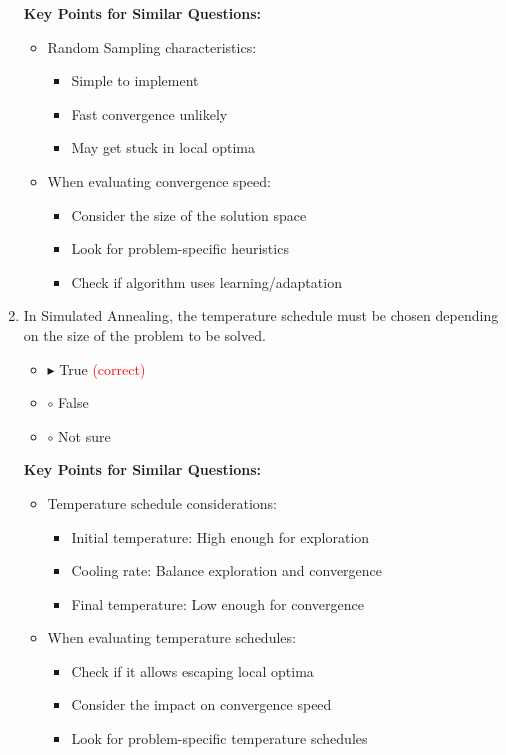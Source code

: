 \begin{enumerate}[label=\alph*)]
\textbf{Key Points for Similar Questions:}
\begin{itemize}
\item Random Sampling characteristics:
  \begin{itemize}
  \item Simple to implement
  \item Fast convergence unlikely
  \item May get stuck in local optima
  \end{itemize}
\item When evaluating convergence speed:
  \begin{itemize}
  \item Consider the size of the solution space
  \item Look for problem-specific heuristics
  \item Check if algorithm uses learning/adaptation
  \end{itemize}
\end{itemize}

\item In Simulated Annealing, the temperature schedule must be chosen depending on the size of the problem to be solved.
\begin{itemize}
\item $\blacktriangleright$ True \hspace{1em} \textcolor{red}{(correct)}
\item $\circ$ False
\item $\circ$ Not sure
\end{itemize}

\textbf{Key Points for Similar Questions:}
\begin{itemize}
\item Temperature schedule considerations:
  \begin{itemize}
  \item Initial temperature: High enough for exploration
  \item Cooling rate: Balance exploration and convergence
  \item Final temperature: Low enough for convergence
  \end{itemize}
\item When evaluating temperature schedules:
  \begin{itemize}
  \item Check if it allows escaping local optima
  \item Consider the impact on convergence speed
  \item Look for problem-specific temperature schedules
  \end{itemize}
\end{itemize}


\end{enumerate}
